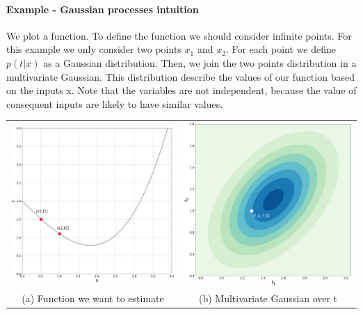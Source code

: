 \documentclass[main.tex]{subfiles}
\begin{document}
\paragraph{Example - Gaussian processes intuition}
We plot a function. To define the function we should consider infinite points. For this example we only consider two points $x_1$ and $x_2$. For each point we define $p(t|x)$ as a Gaussian distribution. Then, we join the two points distribution in a multivariate Gaussian.
This distribution describe the values of our function based on the inputs x. Note that the variables are not independent, because the value of consequent inputs are likely to have similar values.
\newpage
\begin{center}
    \begin{tabular}{cc}
        \includegraphics[width=80mm]{img/GaussianProcesses.jpg} &
        \includegraphics[width=80mm]{img/MultivariateGaussian.jpg}                                 \\
        (a) Function we want to estimate                        & (b) Multivariate Gaussian over t
    \end{tabular}
\end{center}
\end{document}
